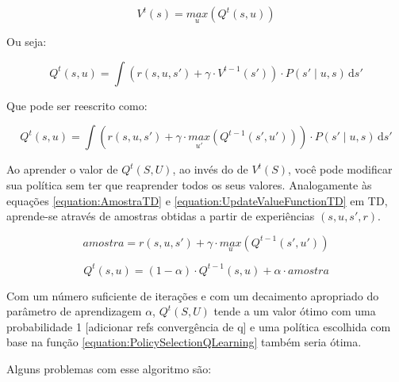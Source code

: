 \begin{equation}
    V^t \left( s \right) = \underset{u}{max} \left( Q^t \left( s, u \right) \right)
\end{equation}

Ou seja:

\begin{equation} \label{equation:QValueFunctionQLearning}
    Q^t \left( s, u \right) = \int \! \left( r \left( s, u, s' \right) + \gamma \cdot V^{t-1} \left( s' \right) \right) \cdot P \left( s' \mid u, s \right) \, \mathrm{d}s'
\end{equation}

Que pode ser reescrito como:

\begin{equation} \label{equation:QValueFunctionQLearningFinal}
    Q^t \left( s, u \right) = \int \! \left( r \left( s, u, s' \right) + \gamma \cdot \underset{u'}{max} \left( Q^{t-1} \left( s', u' \right) \right) \right) \cdot P \left( s' \mid u, s \right) \, \mathrm{d}s'
\end{equation}

Ao aprender o valor de $ Q^t \left( S, U \right) $, ao invés do de $ V^t \left( S \right) $, você pode modificar sua política sem ter que reaprender todos os seus valores. Analogamente às equações \ref{equation:AmostraTD} e \ref{equation:UpdateValueFunctionTD} em TD, aprende-se através de amostras obtidas a partir de experiências $ \left( s, u, s', r \right) $.

\begin{equation} \label{equation:AmostraQLearning}
	amostra = r \left( s, u, s' \right) + \gamma \cdot \underset{u}{max} \left( Q^{t-1} \left( s', u' \right) \right)
\end{equation}

\begin{equation} \label{equation:QUpdateQLearning}
	Q^t \left( s, u \right) = \left( 1 - \alpha \right) \cdot Q^{t-1} \left( s, u \right) + \alpha \cdot amostra
\end{equation}

Com um número suficiente de iterações e com um decaimento apropriado do parâmetro de aprendizagem $ \alpha $, $ Q^t \left( S, U \right) $ tende a um valor ótimo  com uma probabilidade 1 [adicionar refs convergência de q] e uma política escolhida com base na função \ref{equation:PolicySelectionQLearning} também seria ótima.

Alguns problemas com esse algoritmo são:

